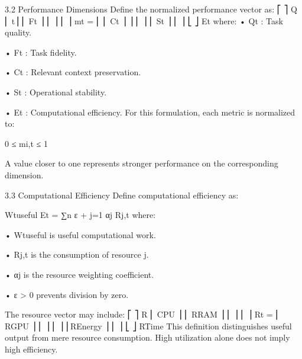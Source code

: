 \documentclass[10pt,a4paper]{article}
\begin{document}
\begin{ManuscriptText}
3.2   Performance Dimensions
Define the normalized performance vector as:
                                               ⎡    ⎤
                                               Q
                                              ⎢ t⎥
                                              ⎢ Ft ⎥
                                              ⎢ ⎥
                                              ⎢ ⎥
                                         mt = ⎢
                                              ⎢ Ct ⎥
                                                   ⎥
                                              ⎢ ⎥
                                              ⎢ St ⎥
                                              ⎢ ⎥
                                              ⎣ ⎦
                                                Et
   where:
  • Qt : Task quality.

  • Ft : Task fidelity.

  • Ct : Relevant context preservation.

  • St : Operational stability.

  • Et : Computational efficiency.
   For this formulation, each metric is normalized to:

                                         0 ≤ mi,t ≤ 1

   A value closer to one represents stronger performance on the corresponding dimension.


3.3     Computational Efficiency
Define computational efficiency as:

                                             Wtuseful
                                   Et =            ∑︁n
                                          ε + j=1 αj Rj,t
    where:

    • Wtuseful is useful computational work.

    • Rj,t is the consumption of resource j.

    • αj is the resource weighting coefficient.

    • ε > 0 prevents division by zero.

    The resource vector may include:
                                               ⎡              ⎤
                                             R
                                           ⎢ CPU ⎥
                                           ⎢ RRAM ⎥
                                           ⎢        ⎥
                                           ⎢        ⎥
                                      Rt = ⎢ RGPU ⎥
                                           ⎢        ⎥
                                           ⎢        ⎥
                                           ⎢REnergy ⎥
                                           ⎢        ⎥
                                           ⎣        ⎦
                                             RTime
    This definition distinguishes useful output from mere resource consumption.
    High utilization alone does not imply high efficiency.



\end{ManuscriptText}
\end{document}
